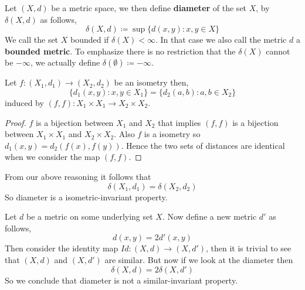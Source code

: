 \documentclass{scrartcl} %
\begin{document}
\begin{definition}
	Let $\left(X,d\right)$ be a metric space, we then define \textbf{diameter} of the set $X$, by $\delta(X,d)$ as
	follows,
		\[
		\delta(X,d) \coloneqq \sup\{d(x,y) : x,y \in X\}
		\]
	We call the set $X$ bounded if $\delta(X) < \infty$. In that case we also call the metric $d$ a \textbf{bounded metric}. To emphasize there is
	no restriction that the $\delta(X)$ cannot be $-\infty$, we actually define 
	$\delta(\emptyset) \coloneqq -\infty$.
\end{definition}
\begin{example}
Let $f :\left(X_1, d_1\right) \rightarrow \left(X_2, d_2\right)$ be an isometry then, 
\[
\{d_1(x,y) : x,y \in X_1\} = \{d_2(a,b) : a,b \in X_2\}
\]
induced by $\left(f,f\right):X_1\times X_1 \rightarrow X_2\times X_2$.\\
\begin{proof}
	$f$ is a bijection between $X_1$ and $X_2$ that implies $(f,f)$ is a bijection between $X_1\times X_1$ and
	$X_2\times X_2$. Also $f$ is a isometry so $d_1(x,y) = d_2(f(x),f(y))$. Hence the two sets of distances are
	identical when we consider the map $(f,f)$.
\end{proof}
From our above reasoning it follows that 
\[
\delta(X_1,d_1) = \delta(X_2,d_2)
\]
So diameter is a isometric-invariant property.
\end{example}
\begin{example}
Let $d$ be a metric on some underlying set $X$. Now define a new metric $d'$ as follows,
\[
	d(x,y) = 2d'(x,y)
\]
Then consider the identity map $Id: (X,d) \rightarrow (X,d')$, then it is trivial to see that $(X,d)$ and $(X,d')$ are 
similar. But now if we look at the diameter then 
\[
	\delta(X,d) = 2\delta(X,d')
\]
So we conclude that diameter is not a similar-invariant property.
\end{example}
\end{document}
